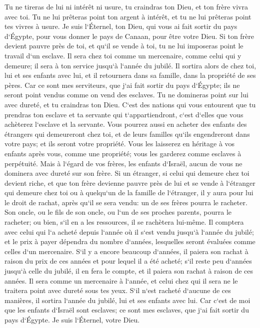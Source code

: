 \verse Tu ne tireras de lui ni intérêt ni usure, tu craindras ton Dieu, et ton frère vivra avec toi. 
\verse Tu ne lui prêteras point ton argent à intérêt, et tu ne lui prêteras point tes vivres à usure. 
\verse Je suis l`Éternel, ton Dieu, qui vous ai fait sortir du pays d`Égypte, pour vous donner le pays de Canaan, pour être votre Dieu. 
\verse Si ton frère devient pauvre près de toi, et qu`il se vende à toi, tu ne lui imposeras point le travail d`un esclave. 
\verse Il sera chez toi comme un mercenaire, comme celui qui y demeure; il sera à ton service jusqu`à l`année du jubilé. 
\verse Il sortira alors de chez toi, lui et ses enfants avec lui, et il retournera dans sa famille, dans la propriété de ses pères. 
\verse Car ce sont mes serviteurs, que j`ai fait sortir du pays d`Égypte; ils ne seront point vendus comme on vend des esclaves. 
\verse Tu ne domineras point sur lui avec dureté, et tu craindras ton Dieu. 
\verse C`est des nations qui vous entourent que tu prendras ton esclave et ta servante qui t`appartiendront, c`est d`elles que vous achèterez l`esclave et la servante. 
\verse Vous pourrez aussi en acheter des enfants des étrangers qui demeureront chez toi, et de leurs familles qu`ils engendreront dans votre pays; et ils seront votre propriété. 
\verse Vous les laisserez en héritage à vos enfants après vous, comme une propriété; vous les garderez comme esclaves à perpétuité. Mais à l`égard de vos frères, les enfants d`Israël, aucun de vous ne dominera avec dureté sur son frère. 
\verse Si un étranger, si celui qui demeure chez toi devient riche, et que ton frère devienne pauvre près de lui et se vende à l`étranger qui demeure chez toi ou à quelqu`un de la famille de l`étranger, 
\verse il y aura pour lui le droit de rachat, après qu`il se sera vendu: un de ses frères pourra le racheter. 
\verse Son oncle, ou le fils de son oncle, ou l`un de ses proches parents, pourra le racheter; ou bien, s`il en a les ressources, il se rachètera lui-même. 
\verse Il comptera avec celui qui l`a acheté depuis l`année où il s`est vendu jusqu`à l`année du jubilé; et le prix à payer dépendra du nombre d`années, lesquelles seront évaluées comme celles d`un mercenaire. 
\verse S`il y a encore beaucoup d`années, il paiera son rachat à raison du prix de ces années et pour lequel il a été acheté; 
\verse s`il reste peu d`années jusqu`à celle du jubilé, il en fera le compte, et il paiera son rachat à raison de ces années. 
\verse Il sera comme un mercenaire à l`année, et celui chez qui il sera ne le traitera point avec dureté sous tes yeux. 
\verse S`il n`est racheté d`aucune de ces manières, il sortira l`année du jubilé, lui et ses enfants avec lui. 
\verse Car c`est de moi que les enfants d`Israël sont esclaves; ce sont mes esclaves, que j`ai fait sortir du pays d`Égypte. Je suis l`Éternel, votre Dieu. 

